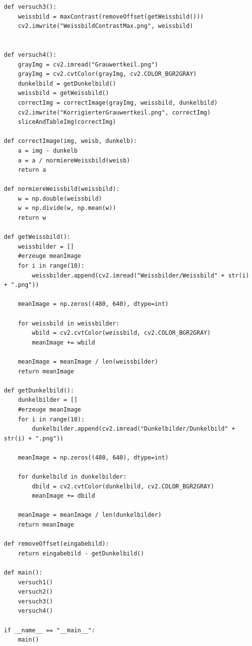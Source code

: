 \documentclass[12pt,oneside,a4paper]{report}
\begin{document}
\begin{lstlisting}[style=PYTHON, frame=single, caption=QuellCodeV1 bis V4, captionpos=b, label=lst:CodeV2]
def versuch3():
    weissbild = maxContrast(removeOffset(getWeissbild()))
    cv2.imwrite("WeissbildContrastMax.png", weissbild)
        

def versuch4():
    grayImg = cv2.imread("Grauwertkeil.png")
    grayImg = cv2.cvtColor(grayImg, cv2.COLOR_BGR2GRAY)
    dunkelbild = getDunkelbild()
    weissbild = getWeissbild()
    correctImg = correctImage(grayImg, weissbild, dunkelbild)
    cv2.imwrite("KorrigierterGrauwertkeil.png", correctImg)
    sliceAndTableImg(correctImg)

def correctImage(img, weisb, dunkelb):
    a = img - dunkelb
    a = a / normiereWeissbild(weisb)
    return a    
    
def normiereWeissbild(weissbild):
    w = np.double(weissbild)
    w = np.divide(w, np.mean(w))
    return w

def getWeissbild():
    weissbilder = []
    #erzeuge meanImage    
    for i in range(10):
        weissbilder.append(cv2.imread("Weissbilder/Weissbild" + str(i) + ".png"))
    
    meanImage = np.zeros((480, 640), dtype=int)

    for weissbild in weissbilder:
        wbild = cv2.cvtColor(weissbild, cv2.COLOR_BGR2GRAY)
        meanImage += wbild
        
    meanImage = meanImage / len(weissbilder)
    return meanImage

def getDunkelbild():
    dunkelbilder = []
    #erzeuge meanImage    
    for i in range(10):
        dunkelbilder.append(cv2.imread("Dunkelbilder/Dunkelbild" + str(i) + ".png"))

    meanImage = np.zeros((480, 640), dtype=int)

    for dunkelbild in dunkelbilder:
        dbild = cv2.cvtColor(dunkelbild, cv2.COLOR_BGR2GRAY)
        meanImage += dbild     
    
    meanImage = meanImage / len(dunkelbilder)
    return meanImage
    
def removeOffset(eingabebild):
    return eingabebild - getDunkelbild()

def main():
    versuch1()
    versuch2()
    versuch3()
    versuch4() 

if __name__ == "__main__":
    main()

    
\end{lstlisting}


%
%

\end{document}
